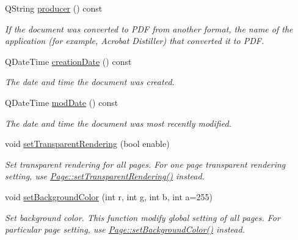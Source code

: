\begin{DoxyCompactItemize}
Q\-String \hyperlink{class_mu_p_d_f_1_1_document_a4b609a777fa9939843a2922f9a292882}{producer} () const 
\begin{DoxyCompactList}\small\item\em If the document was converted to P\-D\-F from another format, the name of the application (for example, Acrobat Distiller) that converted it to P\-D\-F. \end{DoxyCompactList}\item 
Q\-Date\-Time \hyperlink{class_mu_p_d_f_1_1_document_ac741bca965122fbd83c87ce21e28baf1}{creation\-Date} () const 
\begin{DoxyCompactList}\small\item\em The date and time the document was created. \end{DoxyCompactList}\item 
Q\-Date\-Time \hyperlink{class_mu_p_d_f_1_1_document_a9a84e656e58c556a61fe228ccdc3f643}{mod\-Date} () const 
\begin{DoxyCompactList}\small\item\em The date and time the document was most recently modified. \end{DoxyCompactList}\item 
void \hyperlink{class_mu_p_d_f_1_1_document_a8df89d0517437182406e2ba766402a3c}{set\-Transparent\-Rendering} (bool enable)
\begin{DoxyCompactList}\small\item\em Set transparent rendering for all pages. For one page transparent rendering setting, use \hyperlink{class_mu_p_d_f_1_1_page_ac6768d64b88de1ccdd1fa0abb2724db0}{Page\-::set\-Transparent\-Rendering()} instead. \end{DoxyCompactList}\item 
void \hyperlink{class_mu_p_d_f_1_1_document_a0b9669def894d9164543e3367ae11d21}{set\-Background\-Color} (int r, int g, int b, int a=255)
\begin{DoxyCompactList}\small\item\em Set background color. This function modify global setting of all pages. For particular page setting, use \hyperlink{class_mu_p_d_f_1_1_page_a4f16778c9c61692834644d298b6ee77f}{Page\-::set\-Background\-Color()} instead. \end{DoxyCompactList}\end{DoxyCompactItemize}
